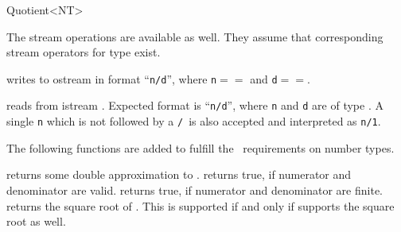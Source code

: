 \begin{ccRefClass} {Quotient<NT>}
\ccHidden {}
{}

The stream operations are available as well. 
They assume that corresponding stream operators for type  exist.

       {writes  to ostream  in format ``{\tt n/d}'', where
       {\tt n}$==$ and {\tt d}$==$.}

       {reads  from istream . Expected format is
        ``{\tt n/d}'', where {\tt n} and {\tt d} are of type .
        A single {\tt n} which is not followed by a {\tt /}\  is also
        accepted and interpreted as {\tt n/1}.}

The following functions are added to fulfill the \cgal\ requirements
on number types.

       {returns some double approximation to .}
\ccGlue
{}
       {returns true, if numerator and denominator are valid.}
\ccGlue
{}
       {returns true, if numerator and denominator are finite.}
\ccGlue
{}
       {returns the square root of .  This is supported if and only if
         supports the square root as well.}

\end{ccRefClass} 

